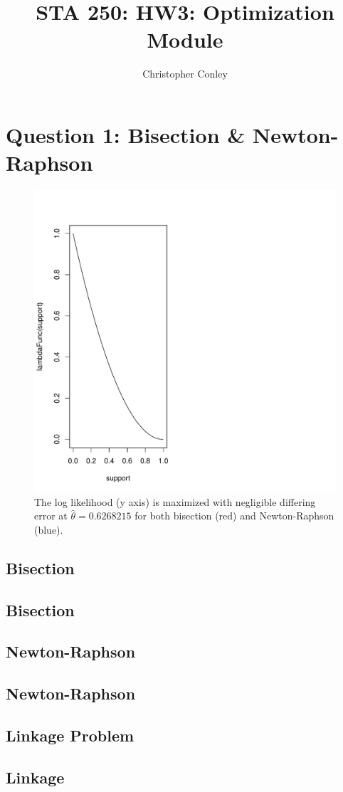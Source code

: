 \documentclass[9pt]{amsart}
\title{STA 250: HW3: Optimization Module}
\author{Christopher Conley}
\date{}                                           %
\newcommand{\prettycode}[2]{
  \hrulefill
  \subsection*{#1}
  
  \vspace{2em}
}
\begin{document}
\maketitle
\doublespacing

\section{Question 1: Bisection \& Newton-Raphson}

\begin{figure}[htbp] %
   \centering
   \includegraphics[scale = 0.5]{../log-lik-mle.pdf} 
   \caption{The log likelihood (y axis) is maximized with negligible differing error at $\hat{\theta} = 0.6268215$ for both bisection (red) and Newton-Raphson (blue).}
   \label{fig:example}
\end{figure}
\subsection{Bisection}
\prettycode{Bisection}{../bisection.r}
\subsection{Newton-Raphson}
\prettycode{Newton-Raphson}{../newton-raphson.r}
\subsection{Linkage Problem}
\prettycode{Linkage}{../mle-multinomial-genetic-linkage.r}
\end{document}

